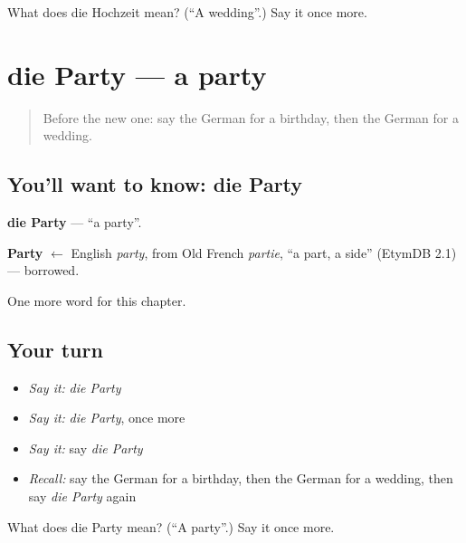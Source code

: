 \begin{tcolorbox}[breakable,colback=teal!4,colframe=teal!35!black,title={Before you move on}]
What does die Hochzeit mean? (\textquotedblleft{}A wedding\textquotedblright{}.) Say it once more.
\end{tcolorbox}
\section[die Party]{die Party — a party}

\label{lesson:GE-C163-party}



\begin{quote}
Before the new one: say the German for a birthday, then the German for a wedding.
\end{quote}

\subsection*{You'll want to know: die Party}
\textbf{die Party} — \textquotedblleft{}a party\textquotedblright{}.

\begin{cousinweb}
\textbf{Party} $\leftarrow$ English \emph{party}, from Old French \emph{partie}, \textquotedblleft{}a part, a side\textquotedblright{} (EtymDB 2.1) — borrowed.
\end{cousinweb}

\begin{grammarlens}[title={What you've built}]
One more word for this chapter.
\end{grammarlens}

\subsection*{Your turn}
\begin{itemize}
\raggedright
  \item \emph{Say it:} \emph{die Party}
  \item \emph{Say it:} \emph{die Party}, once more
  \item \emph{Say it:} say \emph{die Party}
  \item \emph{Recall:} say the German for a birthday, then the German for a wedding, then say \emph{die Party} again
\end{itemize}

\begin{tcolorbox}[breakable,colback=teal!4,colframe=teal!35!black,title={Before you move on}]
What does die Party mean? (\textquotedblleft{}A party\textquotedblright{}.) Say it once more.
\end{tcolorbox}

